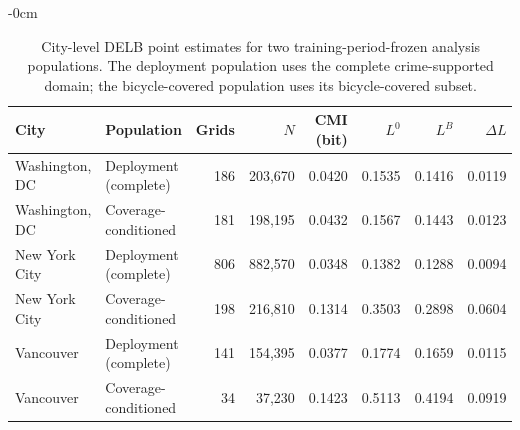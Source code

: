 \begin{table}[!htbp]
\caption{City-level DELB point estimates for two training-period-frozen
analysis populations. The deployment population uses the complete
crime-supported domain; the bicycle-covered population uses its
bicycle-covered subset.}
\label{tab:co_primary_domains}
\begin{adjustwidth}{-\extralength}{0cm}
\centering
\begin{tabular*}{\linewidth}{@{\extracolsep{\fill}}llrrrrrr@{}}
\toprule
\textbf{City} & \textbf{Population} & \textbf{Grids} & \textbf{\(N\)} &
\textbf{CMI (bit)} & \textbf{\(L^0\)} & \textbf{\(L^B\)} &
\textbf{\(\Delta L\)}\\
\midrule
Washington, DC & Deployment (complete) & 186 & 203,670 & 0.0420 & 0.1535 & 0.1416 & 0.0119\\
Washington, DC & Coverage-conditioned & 181 & 198,195 & 0.0432 & 0.1567 & 0.1443 & 0.0123\\
New York City & Deployment (complete) & 806 & 882,570 & 0.0348 & 0.1382 & 0.1288 & 0.0094\\
New York City & Coverage-conditioned & 198 & 216,810 & 0.1314 & 0.3503 & 0.2898 & 0.0604\\
Vancouver & Deployment (complete) & 141 & 154,395 & 0.0377 & 0.1774 & 0.1659 & 0.0115\\
Vancouver & Coverage-conditioned & 34 & 37,230 & 0.1423 & 0.5113 & 0.4194 & 0.0919\\
\bottomrule
\end{tabular*}
\end{adjustwidth}
\end{table}

